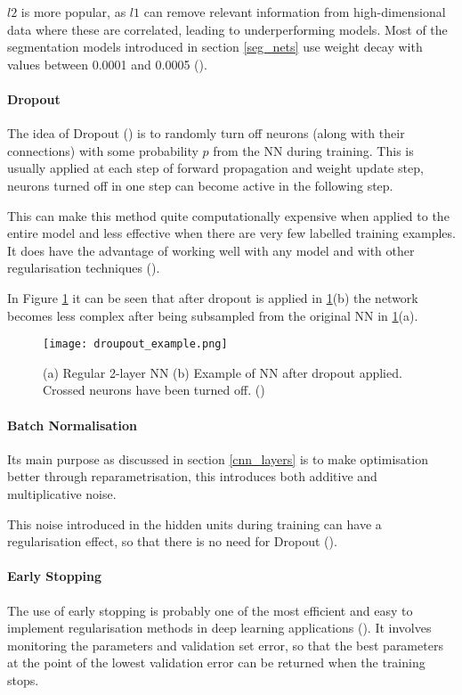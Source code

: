 $l2$ is more popular, as $l1$ can remove relevant information from high-dimensional data where these are correlated, leading to underperforming models. Most of the segmentation models introduced in section \ref{seg_nets} use weight decay with values between 0.0001 and 0.0005 (\cite{sultana2020106062}).
\paragraph{Dropout} 
The idea of Dropout (\cite{JMLR:v15:srivastava14a}) is to randomly turn off neurons (along with their connections) with some probability $p$ from the \gls{NN} during training. This is usually applied at each step of forward propagation and weight update step, neurons turned off in one step can become active in the following step.

This can make this method quite computationally expensive when applied to the entire model and less effective when there are very few labelled training examples. It does have the advantage of working well with any model and with other regularisation techniques (\cite{GoodBengCour16}).

In Figure \ref{fig_dropout} it can be seen that after dropout is applied in \ref{fig_dropout}(b) the network becomes less complex after being subsampled from the original \gls{NN} in \ref{fig_dropout}(a).

    \begin{figure}[hbt!]
        \centering
        \texttt{[image: droupout\_example.png]}
        \caption{(a) Regular 2-layer \gls{NN} (b) Example of \gls{NN} after dropout applied. Crossed neurons have been turned off. (\cite{shanmugamani2018deep})}
        \label{fig_dropout}
    \end{figure}

\paragraph{Batch Normalisation}
Its main purpose as discussed in section \ref{cnn_layers} is to make optimisation better through reparametrisation, this introduces both additive and multiplicative noise.

This noise introduced in the hidden units during training can have a regularisation effect, so that there is no need for Dropout (\cite{GoodBengCour16}).
\paragraph{Early Stopping} 
The use of early stopping is probably one of the most efficient and easy to implement regularisation methods in deep learning applications (\cite{GoodBengCour16}). It involves monitoring the parameters and validation set error, so that the best parameters at the point of the lowest validation error can be returned when the training stops. 

